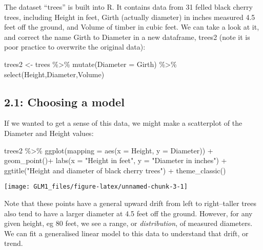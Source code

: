 \documentclass[
]{article}
\newenvironment{Shaded}{\begin{snugshade}}{\end{snugshade}}
\newcommand{\AttributeTok}[1]{\textcolor[rgb]{0.77,0.63,0.00}{#1}}
\newcommand{\FunctionTok}[1]{\textcolor[rgb]{0.00,0.00,0.00}{#1}}
\newcommand{\NormalTok}[1]{#1}
\newcommand{\OtherTok}[1]{\textcolor[rgb]{0.56,0.35,0.01}{#1}}
\newcommand{\SpecialCharTok}[1]{\textcolor[rgb]{0.00,0.00,0.00}{#1}}
\newcommand{\StringTok}[1]{\textcolor[rgb]{0.31,0.60,0.02}{#1}}
\begin{document}
The dataset ``trees'' is built into R. It contains data from 31 felled
black cherry trees, including Height in feet, Girth (actually diameter)
in inches measured 4.5 feet off the ground, and Volume of timber in
cubic feet. We can take a look at it, and correct the name Girth to
Diameter in a new dataframe, trees2 (note it is poor practice to
overwrite the original data):

\begin{Shaded}
\begin{Highlighting}[]
\NormalTok{trees2 }\OtherTok{\textless{}{-}}\NormalTok{ trees }\SpecialCharTok{\%\textgreater{}\%}
  \FunctionTok{mutate}\NormalTok{(}\AttributeTok{Diameter =}\NormalTok{ Girth) }\SpecialCharTok{\%\textgreater{}\%}
  \FunctionTok{select}\NormalTok{(Height,Diameter,Volume)}
\end{Highlighting}
\end{Shaded}

\hypertarget{choosing-a-model}{%
\subsection{2.1: Choosing a model}\label{choosing-a-model}}

If we wanted to get a sense of this data, we might make a scatterplot of
the Diameter and Height values:

\begin{Shaded}
\begin{Highlighting}[]
\NormalTok{    trees2 }\SpecialCharTok{\%\textgreater{}\%}
      \FunctionTok{ggplot}\NormalTok{(}\AttributeTok{mapping =} \FunctionTok{aes}\NormalTok{(}\AttributeTok{x =}\NormalTok{ Height, }\AttributeTok{y =}\NormalTok{ Diameter)) }\SpecialCharTok{+}
      \FunctionTok{geom\_point}\NormalTok{()}\SpecialCharTok{+}
      \FunctionTok{labs}\NormalTok{(}\AttributeTok{x =} \StringTok{"Height in feet"}\NormalTok{, }\AttributeTok{y =} \StringTok{"Diameter in inches"}\NormalTok{) }\SpecialCharTok{+}
      \FunctionTok{ggtitle}\NormalTok{(}\StringTok{"Height and diameter of black cherry trees"}\NormalTok{) }\SpecialCharTok{+}
      \FunctionTok{theme\_classic}\NormalTok{()}
\end{Highlighting}
\end{Shaded}

\begin{center}\texttt{[image: GLM1\_files/figure-latex/unnamed-chunk-3-1]} \end{center}

Note that these points have a general upward drift from left to
right--taller trees also tend to have a larger diameter at 4.5 feet off
the ground. However, for any given height, eg 80 feet, we see a range,
or \emph{distribution}, of measured diameters. We can fit a generalised
linear model to this data to understand that drift, or trend.
\end{document}
